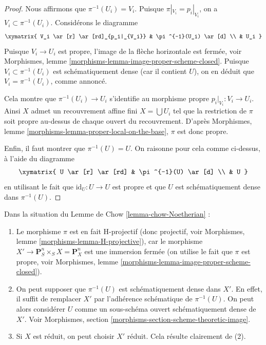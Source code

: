 \begin{proof}
\medskip\noindent
Nous affirmons que $\pi^{-1}(U_i) = V_i$.
Puisque $\pi|_{V_i} = p_i|_{V_i}$, on a
$V_i \subset \pi^{-1}(U_i)$. Considérons le diagramme
$$
\xymatrix{
V_i \ar[r] \ar[rd]_{p_i|_{V_i}} & \pi^{-1}(U_i) \ar[d] \\
& U_i
}
$$
Puisque $V_i \to U_i$ est propre, l'image de la flèche
horizontale est fermée, voir
Morphismes, lemme \ref{morphisms-lemma-image-proper-scheme-closed}.
Puisque $V_i \subset \pi^{-1}(U_i)$ est schématiquement
dense (car il contient $U$),
on en déduit que $V_i = \pi^{-1}(U_i)$, comme annoncé.

\medskip\noindent
Cela montre que $\pi^{-1}(U_i) \to U_i$ s'identifie au morphisme
propre $p_i|_{V_i} : V_i \to U_i$. Ainsi $X$ admet un
recouvrement affine fini $X = \bigcup U_i$ tel que la restriction
de $\pi$ soit propre au-dessus de chaque ouvert du
recouvrement. D'après Morphismes, lemme \ref{morphisms-lemma-proper-local-on-the-base},
$\pi$ est donc propre.

\medskip\noindent
Enfin, il faut montrer que $\pi^{-1}(U) = U$. On raisonne pour cela comme
ci-dessus, à l'aide du diagramme
$$
\xymatrix{
U \ar[r] \ar[rd] & \pi^{-1}(U) \ar[d] \\
& U
}
$$
en utilisant le fait que $\text{id}_U : U \to U$ est propre et que
$U$ est schématiquement dense dans $\pi^{-1}(U)$.
\end{proof}

\begin{remark}
\label{remark-chow-Noetherian}
Dans la situation du Lemme de
Chow \ref{lemma-chow-Noetherian} :
\begin{enumerate}
\item Le morphisme $\pi$ est en fait H-projectif (donc projectif, voir
Morphismes, lemme \ref{morphisms-lemma-H-projective}),
car le morphisme $X' \to \mathbf{P}^n_S \times_S X = \mathbf{P}^n_X$
est une immersion fermée (on utilise le fait que $\pi$ est propre, voir
Morphismes, lemme \ref{morphisms-lemma-image-proper-scheme-closed}).
\item On peut supposer que $\pi^{-1}(U)$ est schématiquement dense
dans $X'$. En effet, il suffit de remplacer $X'$ par l'adhérence schématique
de $\pi^{-1}(U)$. On peut alors considérer $U$ comme un
sous-schéma ouvert schématiquement dense de $X'$.
Voir Morphismes, section \ref{morphisms-section-scheme-theoretic-image}.
\item Si $X$ est réduit, on peut choisir $X'$ réduit. Cela résulte clairement
de (2).
\end{enumerate}
\end{remark}






